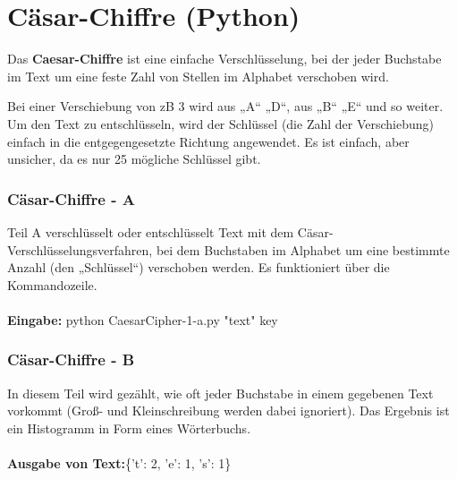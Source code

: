 \chapter{Cäsar-Chiffre (Python)}
Das \textbf{Caesar-Chiffre} ist eine einfache Verschlüsselung, bei der jeder Buchstabe im Text um eine feste Zahl von Stellen im Alphabet verschoben wird.\par
Bei einer Verschiebung von \ac{zB} 3 wird aus „A“ „D“, aus „B“ „E“ und so weiter. Um den Text zu entschlüsseln, wird der Schlüssel (die Zahl der Verschiebung) einfach in die entgegengesetzte Richtung angewendet.
Es ist einfach, aber unsicher, da es nur 25 mögliche Schlüssel gibt.

\subsection*{Cäsar-Chiffre - A}
Teil A verschlüsselt oder entschlüsselt Text mit dem Cäsar-Verschlüsselungsverfahren, bei dem Buchstaben im Alphabet um eine bestimmte Anzahl (den „Schlüssel“) verschoben werden. Es funktioniert über die Kommandozeile.\\\\
\textbf{Eingabe:} python CaesarCipher-1-a.py "text" key
\begin{codeblock}
    
\end{codeblock}

\subsection*{Cäsar-Chiffre - B}
In diesem Teil wird gezählt, wie oft jeder Buchstabe in einem gegebenen Text vorkommt (Groß- und Kleinschreibung werden dabei ignoriert). Das Ergebnis ist ein Histogramm in Form eines Wörterbuchs.\\\\
\textbf{Ausgabe von Text:}\quad \{'t': 2, 'e': 1, 's': 1\}
\begin{codeblock}
    
\end{codeblock}

